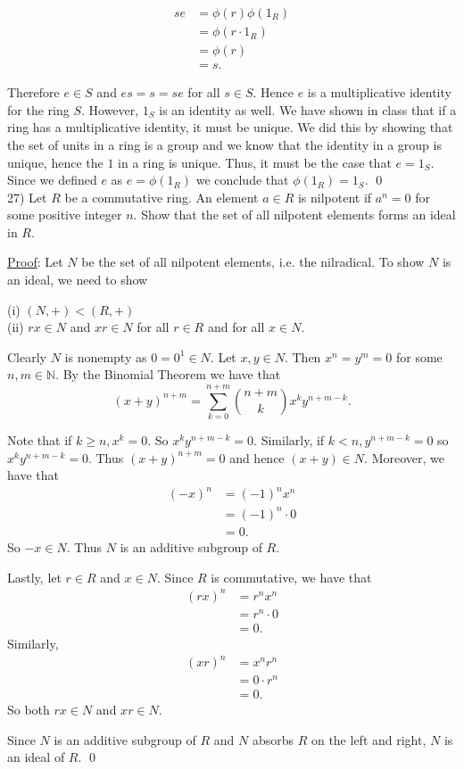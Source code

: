 \documentclass{article}
\begin{document}
\begin{align*}
	se &= \phi(r) \phi(1_R) \\
	&= \phi(r \cdot 1_R) \\
	&= \phi(r) \\
	&= s.
\end{align*}

Therefore $e \in S$ and $es = s = se$ for all $s \in S$. Hence $e$ is a multiplicative identity for the ring $S$. However, $1_S$ is an identity as well. We have shown in class that if a ring has a multiplicative identity, it must be unique. We did this by showing that the set of units in a ring is a group and we know that the identity in a group is unique, hence the $1$ in a ring is unique. Thus, it must be the case that $e = 1_S$. Since we defined $e$ as $e = \phi(1_R)$ we conclude that $\phi(1_R) = 1_S$. \qed \\

27) Let $R$ be a commutative ring. An element $a \in R$ is nilpotent if $a^n = 0$ for some positive integer $n$. Show that the set of all nilpotent elements forms an ideal in $R$. 

\underline{Proof}: Let $N$ be the set of all nilpotent elements, i.e. the nilradical. To show $N$ is an ideal, we need to show

(i) $(N, +) < (R, +)$ \\
(ii) $rx \in N$ and $xr \in N$ for all $r \in R$ and for all $x \in N$.

Clearly $N$ is nonempty as $0 = 0^1 \in N$. Let $x, y \in N$. Then $x^n = y^m = 0$ for some $n, m \in \mathbb{N}$. By the Binomial Theorem we have that
$$ (x+y)^{n+m} = \sum_{k=0}^{n+m} { {n+m}\choose{k} } x^k y^{n+m-k}.$$

Note that if $k \geq n, x^k = 0$. So $x^ky^{n+m-k} = 0$. Similarly, if $k < n, y^{n+m-k} = 0$ so $x^ky^{n+m-k} = 0$. Thus $(x+y)^{n+m} =0$ and hence $(x+y) \in N$. Moreover, we have that 
\begin{align*}
	(-x)^n &= (-1)^n x^n \\
	&= (-1)^n \cdot 0 \\
	&= 0.
\end{align*}
So $-x \in N$. Thus $N$ is an additive subgroup of $R$.

Lastly, let $r \in R$ and $x \in N$. Since $R$ is commutative, we have that
\begin{align*}
	(rx)^n &= r^n x^n \\
	&= r^n \cdot 0 \\
	&= 0.
\end{align*}
Similarly, 
\begin{align*}
	(xr)^n &= x^n r^n \\
	&= 0 \cdot r^n \\
	&= 0.
\end{align*}
So both $rx \in N$ and $xr \in N$.

Since $N$ is an additive subgroup of $R$ and $N$ absorbs $R$ on the left and right, $N$ is an ideal of $R$. \qed \\
\end{document}
